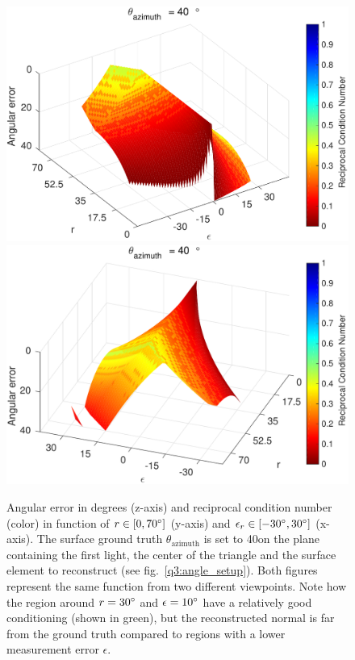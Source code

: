 \documentclass{report}
\begin{document}
\begin{figure}
  \centering
  \includegraphics[width=0.45\linewidth]{q3_experiment_1_view_1.pdf}
  \includegraphics[width=0.45\linewidth]{q3_experiment_1_view_2.pdf}
  \caption[Experiment 1]
   {Angular error in degrees (z-axis) and reciprocal condition number (color) in function of $r \in \left[0, 70\degree\right]$ (y-axis) and $\epsilon_r \in \left[-30\degree, 30\degree\right]$ (x-axis). The surface ground truth $\theta_{\text{azimuth}}$ is set to 40\degree on the plane containing the first light, the center of the triangle and the surface element to reconstruct (see fig.~\ref{q3:angle_setup}). Both figures represent the same function from two different viewpoints. Note how the region around $r = 30\degree$ and $\epsilon = 10\degree$ have a relatively good conditioning (shown in green), but the reconstructed normal is far from the ground truth compared to regions with a lower measurement error $\epsilon$.}
  \label{q3:exp1}
\end{figure}
\end{document}
